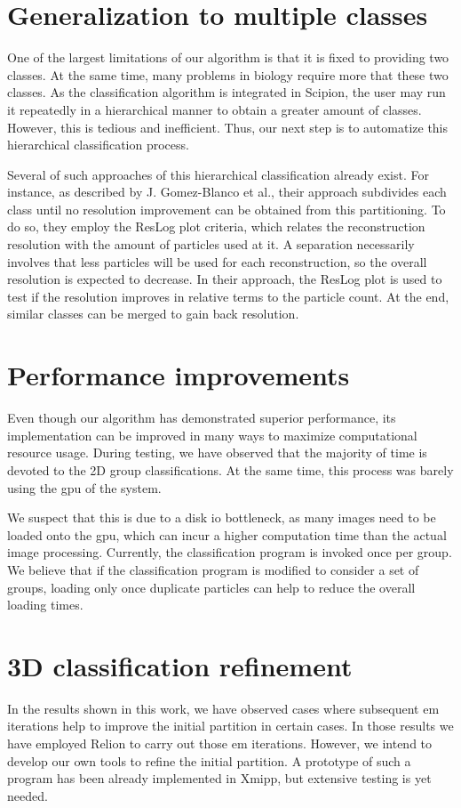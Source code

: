 \documentclass[../main.tex]{subfiles}
\begin{document}
\section{Generalization to multiple classes}
One of the largest limitations of our algorithm is that it is fixed to providing two classes. At the same time, many problems in biology require more that these two classes. As the classification algorithm is integrated in Scipion, the user may run it repeatedly in a hierarchical manner to obtain a greater amount of classes. However, this is tedious and inefficient. Thus, our next step is to automatize this hierarchical classification process. 

Several of such approaches of this hierarchical classification already exist. For instance, as described by J. Gomez-Blanco et al., their approach subdivides each class until no resolution improvement can be obtained from this partitioning. To do so, they employ the ResLog plot criteria, which relates the reconstruction resolution with the amount of particles used at it\cite{stagg2014}. A separation necessarily involves that less particles will be used for each reconstruction, so the overall resolution is expected to decrease. In their approach, the ResLog plot is used to test if the resolution improves in relative terms to the particle count. At the end, similar classes can be merged to gain back resolution\cite{gomezblanco2022}.

\section{Performance improvements}
Even though our algorithm has demonstrated superior performance, its implementation can be improved in many ways to maximize computational resource usage. During testing, we have observed that the majority of time is devoted to the 2D group classifications. At the same time, this process was barely using the \gls{gpu} of the system. 

We suspect that this is due to a disk \gls{io} bottleneck, as many images need to be loaded onto the \gls{gpu}, which can incur a higher computation time than the actual image processing. Currently, the classification program is invoked once per group. We believe that if the classification program is modified to consider a set of groups, loading only once duplicate particles can help to reduce the overall loading times.

\section{3D classification refinement}
In the results shown in this work, we have observed cases where subsequent \gls{em} iterations help to improve the initial partition in certain cases. In those results we have employed Relion to carry out those \gls{em} iterations. However, we intend to develop our own tools to refine the initial partition. A prototype of such a program has been already implemented in Xmipp, but extensive testing is yet needed. 
\end{document}
